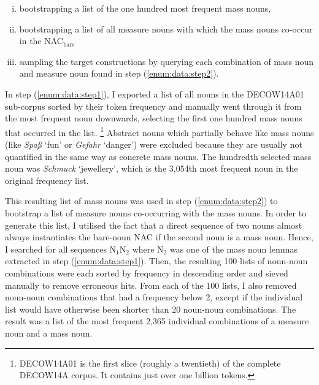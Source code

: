 \documentclass[USenglish]{article}
\newcommand{\Sub}[1]{\ensuremath{\mathrm{_{#1}}}}
\newcommand{\NACb}{NAC\Sub{bare}}
\begin{document}
\begin{enumerate}[i.]
  \item\label{enum:data:step1} bootstrapping a list of the one hundred most frequent mass nouns,
  \item\label{enum:data:step2} bootstrapping a list of all measure nouns with which the mass nouns co-occur in the \NACb 
  \item\label{enum:data:step3} sampling the target constructions by querying each combination of mass noun and measure noun found in step (\ref{enum:data:step2}).
\end{enumerate}

\vspace{-1\baselineskip}

In step (\ref{enum:data:step1}), I exported a list of all nouns in the DECOW14A01 sub-corpus sorted by their token frequency and manually went through it from the most frequent noun downwards, selecting the first one hundred mass nouns that occurred in the list.%
\footnote{DECOW14A01 is the first slice (roughly a twentieth) of the complete DECOW14A corpus.
It contains just over one billion tokens.}
Abstract nouns which partially behave like mass nouns (like \textit{Spaß} `fun’ or \textit{Gefahr} `danger’) were excluded because they are usually not quantified in the same way as concrete mass nouns.
The hundredth selected mass noun was \textit{Schmuck} `jewellery’, which is the 3,054th most frequent noun in the original frequency list.

This resulting list of mass nouns was used in step (\ref{enum:data:step2}) to bootstrap a list of measure nouns co-occurring with the mass nouns. 
In order to generate this list, I utilised the fact that a direct sequence of two nouns almost always instantiates the bare-noun NAC if the second noun is a mass noun.
Hence, I searched for all sequences N\Sub{1}N\Sub{2} where N\Sub{2} was one of the mass noun lemmas extracted in step (\ref{enum:data:step1}).
Then, the resulting 100 lists of noun-noun combinations were each sorted by frequency in descending order and sieved manually to remove erroneous hits.
From each of the 100 lists, I also removed noun-noun combinations that had a frequency below 2, except if the individual list would have otherwise been shorter than 20 noun-noun combinations.
The result was a list of the most frequent 2,365 individual combinations of a measure noun and a mass noun.
\end{document}
